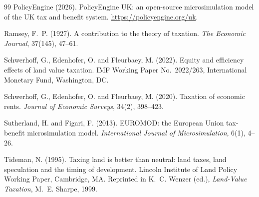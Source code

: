 \begin{thebibliography}{99}
PolicyEngine (2026).
\newblock PolicyEngine UK: an open-source microsimulation model of the UK tax and benefit system.
\newblock \url{https://policyengine.org/uk}.

Ramsey, F.~P. (1927).
\newblock A contribution to the theory of taxation.
\newblock \emph{The Economic Journal}, 37(145), 47--61.

Schwerhoff, G., Edenhofer, O. and Fleurbaey, M. (2022).
\newblock Equity and efficiency effects of land value taxation.
\newblock IMF Working Paper No.~2022/263, International Monetary Fund, Washington, DC.

Schwerhoff, G., Edenhofer, O. and Fleurbaey, M. (2020).
\newblock Taxation of economic rents.
\newblock \emph{Journal of Economic Surveys}, 34(2), 398--423.

Sutherland, H. and Figari, F. (2013).
\newblock EUROMOD: the European Union tax-benefit microsimulation model.
\newblock \emph{International Journal of Microsimulation}, 6(1), 4--26.

Tideman, N. (1995).
\newblock Taxing land is better than neutral: land taxes, land speculation and the timing of development.
\newblock Lincoln Institute of Land Policy Working Paper, Cambridge, MA. Reprinted in K.~C. Wenzer (ed.), \emph{Land-Value Taxation}, M.~E. Sharpe, 1999.

\end{thebibliography}
